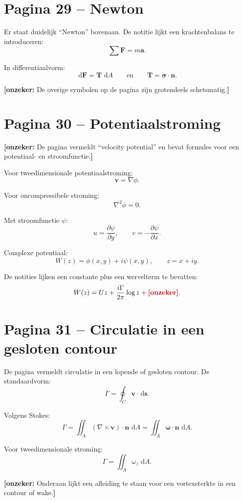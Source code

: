 \documentclass[11pt,a4paper]{article}
\newcommand{\onzeker}[1]{\ifmmode\text{\color{red!70!black}\bfseries[onzeker]}\else\textcolor{red!70!black}{\textbf{[onzeker:} #1\textbf{]}}\fi}
\newcommand{\dd}{\,\mathrm{d}}
\newcommand{\p}{\partial}
\newcommand{\grad}{\nabla}
\newcommand{\curl}{\nabla\times}
\begin{document}
\section*{Pagina 29 -- Newton}

Er staat duidelijk ``Newton'' bovenaan. De notitie lijkt een krachtenbalans te introduceren:
\[
    \sum \mathbf{F}=m\mathbf{a}.
\]

In differentiaalvorm:
\[
    \dd \mathbf{F}
    =
    \mathbf{T}\,\dd A
    \qquad\text{en}\qquad
    \mathbf{T}=\bm{\sigma}\cdot\mathbf{n}.
\]

\onzeker{De overige symbolen op de pagina zijn grotendeels schetsmatig.}

\section*{Pagina 30 -- Potentiaalstroming}

\onzeker{De pagina vermeldt ``velocity potential'' en bevat formules voor een potentiaal- en stroomfunctie.}

Voor tweedimensionale potentiaalstroming:
\[
    \mathbf{v}=\grad\phi .
\]

Voor oncompressibele stroming:
\[
    \nabla^2 \phi =0 .
\]

Met stroomfunctie $\psi$:
\[
    u=\frac{\p\psi}{\p y},
    \qquad
    v=-\frac{\p\psi}{\p x}.
\]

Complexe potentiaal:
\[
    W(z)=\phi(x,y)+i\psi(x,y),
    \qquad
    z=x+iy .
\]

De notities lijken een constante plus een wervelterm te bevatten:
\[
    W(z)
    =
    U z
    +
    \frac{i\Gamma}{2\pi}\log z
    +
    \onzeker{C}.
\]

\section*{Pagina 31 -- Circulatie in een gesloten contour}

De pagina vermeldt circulatie in een lopende of gesloten contour. De standaardvorm:
\[
    \Gamma
    =
    \oint_C \mathbf{v}\cdot\dd\mathbf{s}.
\]

Volgens Stokes:
\[
    \Gamma
    =
    \iint_A \left(\curl\mathbf{v}\right)\cdot\mathbf{n}\,\dd A
    =
    \iint_A \bm{\omega}\cdot\mathbf{n}\,\dd A .
\]

Voor tweedimensionale stroming:
\[
    \Gamma
    =
    \iint_A \omega_z\,\dd A .
\]

\onzeker{Onderaan lijkt een afleiding te staan voor een vortexsterkte in een contour of wake.}
\end{document}
